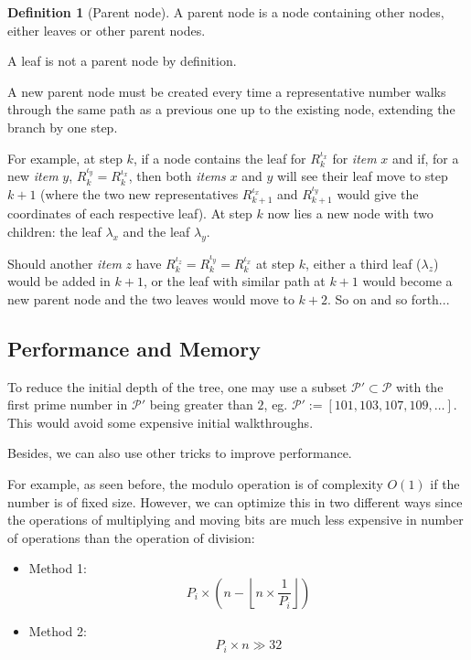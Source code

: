 \documentclass[twoside,twocolumn]{article}
\newcommand{\floor}[1]{\left\lfloor #1 \right\rfloor}
\theoremstyle{definition}
\newtheorem{definition}{Definition}
\theoremstyle{remark}
\begin{document}
\begin{definition}[Parent node]
    \label{parent}
    A parent node is a node containing other nodes, either leaves or other parent nodes.

    A leaf is not a parent node by definition.
\end{definition}

A new parent node must be created every time a representative number walks through the same path as a previous one up to the existing node, 
extending the branch by one step.

For example, at step $k$, if a node contains the leaf for $R_k^{\iota_x}$ for \emph{item} $x$ and if, for a new \emph{item} $y$, $R_k^{\iota_y} = 
R_k^{\iota_x}$, then both \emph{items} $x$ and $y$ will see their leaf move to step $k+1$ (where the two new representatives $R_{k+1}^{\iota_x}$ 
and $R_{k+1}^{\iota_y}$ would give the coordinates of each respective leaf). At step $k$ now lies a new node with two children: the leaf $\lambda_x$ 
and the leaf $\lambda_y$.

Should another \emph{item} $z$ have $R_k^{\iota_z} = R_k^{\iota_y} = R_k^{\iota_x}$ at step $k$, either a third leaf ($\lambda_z$) would be added 
in $k+1$, or the leaf with similar path at $k+1$ would become a new parent node and the two leaves would move to $k+2$. So on and so forth...

\subsection{Performance and Memory}

To reduce the initial depth of the tree, one may use a subset $\mathcal{P}' \subset \mathcal{P}$ with the first prime number in $\mathcal{P}'$ 
being greater than $2$, eg. $\mathcal{P}' := [101, 103, 107, 109, \dots]$. This would avoid some expensive initial walkthroughs.

Besides, we can also use other tricks to improve performance.

For example, as seen before, the modulo operation is of complexity $O(1)$ if the number is of fixed size. However, we can optimize this in two 
different ways since the operations of multiplying and moving bits are much less expensive in number of operations than the operation of division:
\begin{itemize}
    \item Method 1:
        \begin{equation}
            \label{eq:alt1}
            P_i \times \left( n - \floor{n \times \frac{1}{P_i}} \right)
        \end{equation}
    \item Method 2:
        \begin{equation}
            \label{eq:alt2}
            P_i \times n \gg 32 
        \end{equation}
\end{itemize}
\end{document}
